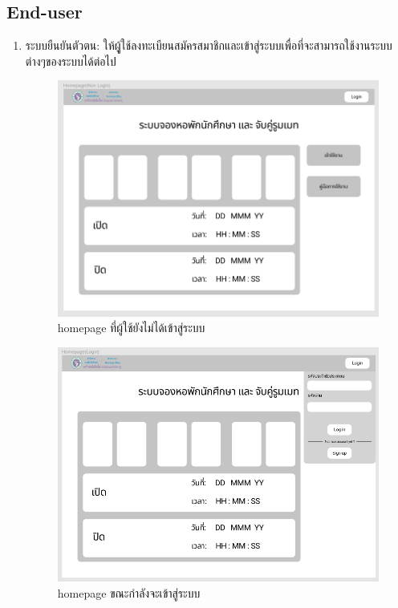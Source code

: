 \subsection{End-user}
\begin{enumerate}
\item ระบบยืนยันตัวตน: ให้ผูู้ใช้ลงทะเบียนสมัครสมาชิกและเข้าสู่ระบบเพื่อที่จะสามารถใช้งานระบบต่างๆของระบบได้ต่อไป
\begin{figure}[h]
\begin{center}
\includegraphics[width=\linewidth]{photo/homepageNoAuth.png}
\end{center}
\caption{homepage ที่ผู้ใช้ยังไม่ได้เข้าสู่ระบบ}
\label{fig:hp-no-auth}
\end{figure}

  \begin{figure}[h]
  \begin{center}
  \includegraphics[width=\linewidth]{photo/homepageLogin.png}
  \end{center}
  \caption{homepage ขณะกำลังจะเข้าสู่ระบบ}
  \label{fig:hp-login}
  \end{figure}


\end{enumerate}
